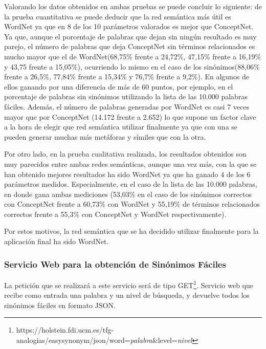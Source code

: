 Valorando los datos obtenidos en ambas pruebas se puede concluir lo siguiente: de la prueba cuantitativa se puede deducir que la red semántica más útil es WordNet ya que en 8 de los 10 parámetros valorados es mejor que ConceptNet. Ya que, aunque el porcentaje de palabras que dejan sin ningún resultado es muy parejo, el número de palabras que deja ConceptNet sin términos relacionados es mucho mayor que el de WordNet(68,75\% frente a 24,72\%, 47,15\% frente a 16,19\% y 43,75 frente a 15,05\%), ocurriendo lo mismo en el caso de los sinónimos(88,06\% frente a 26,5\%, 77,84\% frente a 15,34\% y 76,7\% frente a 9,2\%). En algunos de ellos ganando por una diferencia de más de 60 puntos, por ejemplo, en el porcentaje de palabras sin sinónimos utilizando la lista de las 10.000 palabras fáciles. Además, el número de palabras generadas por WordNet es casi 7 veces mayor que por ConceptNet (14.172 frente a 2.652) lo que supone un factor clave a la hora de elegir que red semántica utilizar finalmente ya que con una se pueden generar muchas más metáforas y símiles que con la otra.

Por otro lado, en la prueba cualitativa realizada, los resultados obtenidos son muy parecidos entre ambas redes semánticas, aunque una vez más, con la que se han obtenido mejores resultados ha sido WordNet ya que ha ganado 4 de los 6 parámetros medidos. Especialmente, en el caso de la lista de las 10.000 palabras, en donde gana ambas mediciones (53,03\% en el caso de los sinónimos correctos con ConceptNet frente a 60,73\% con WordNet y 55,19\% de términos relacionados correctos frente a 55,3\% con ConceptNet y WordNet respectivamente).

Por estos motivos, la red semántica que se ha decidido utilizar finalmente para la aplicación final ha sido WordNet.



 


\subsubsection{Servicio Web para la obtención de Sinónimos Fáciles}
\label{cap:subsec:sw_sinonimosfaciles}

La petición que se realizará a este servicio será de tipo GET\footnote{https://holstein.fdi.ucm.es/tfg-analogias/easysynonym/json/word=\textit{palabra}\&level=\textit{nivel}}.
Servicio web que recibe como entrada una palabra y un nivel de búsqueda, y devuelve todos los sinónimos fáciles en formato JSON. 

